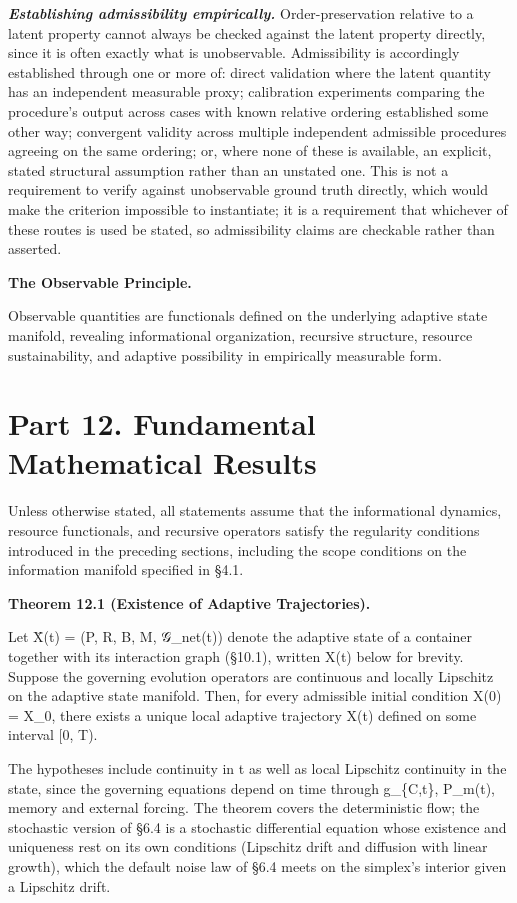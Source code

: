 \documentclass[
]{article}
\begin{document}
\emph{\textbf{Establishing admissibility empirically.}}
Order-preservation relative to a latent property cannot always be
checked against the latent property directly, since it is often exactly
what is unobservable. Admissibility is accordingly established through
one or more of: direct validation where the latent quantity has an
independent measurable proxy; calibration experiments comparing the
procedure's output across cases with known relative ordering established
some other way; convergent validity across multiple independent
admissible procedures agreeing on the same ordering; or, where none of
these is available, an explicit, stated structural assumption rather
than an unstated one. This is not a requirement to verify against
unobservable ground truth directly, which would make the criterion
impossible to instantiate; it is a requirement that whichever of these
routes is used be stated, so admissibility claims are checkable rather
than asserted.

\textbf{The Observable Principle.}

Observable quantities are functionals defined on the underlying adaptive
state manifold, revealing informational organization, recursive
structure, resource sustainability, and adaptive possibility in
empirically measurable form.

\hypertarget{part-12.-fundamental-mathematical-results}{%
\section{Part 12. Fundamental Mathematical
Results}\label{part-12.-fundamental-mathematical-results}}

Unless otherwise stated, all statements assume that the informational
dynamics, resource functionals, and recursive operators satisfy the
regularity conditions introduced in the preceding sections, including
the scope conditions on the information manifold specified in §4.1.

\textbf{Theorem 12.1 (Existence of Adaptive Trajectories).}

Let X̄(t) = (P, R, B, M, 𝒢\_net(t)) denote the adaptive state of a
container together with its interaction graph (§10.1), written X(t)
below for brevity. Suppose the governing evolution operators are
continuous and locally Lipschitz on the adaptive state manifold. Then,
for every admissible initial condition X(0) = X\_0, there exists a
unique local adaptive trajectory X(t) defined on some interval {[}0, T).

The hypotheses include continuity in t as well as local Lipschitz
continuity in the state, since the governing equations depend on time
through g\_\{C,t\}, P\_m(t), memory and external forcing. The theorem
covers the deterministic flow; the stochastic version of §6.4 is a
stochastic differential equation whose existence and uniqueness rest on
its own conditions (Lipschitz drift and diffusion with linear growth),
which the default noise law of §6.4 meets on the simplex's interior
given a Lipschitz drift.
\end{document}
